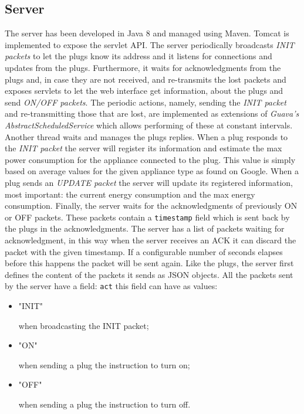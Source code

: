 \documentclass[conference]{IEEEtran}
\begin{document}
	\subsection{Server}\label{SVR}
	The server has been developed in Java 8 and managed using Maven. Tomcat is implemented to expose the servlet API. The server periodically broadcasts \textit{INIT packets} to let the plugs know its address and it listens for connections and updates from the plugs. Furthermore, it waits for acknowledgments from the plugs and, in case they are not received, and re-transmits the lost packets and exposes servlets to let the web interface get information, about the plugs and send \textit{ON/OFF packets}. The periodic actions, namely, sending the \textit{INIT packet} and re-transmitting those that are lost, are implemented as extensions of \textit{Guava's AbstractScheduledService} which allows performing of these at constant intervals. Another thread waits and manages the plugs replies. When a plug responds to the \textit{INIT packet} the server will register its information and estimate the max power consumption for the appliance connected to the plug. This value is simply based on average values for the given appliance type as found on Google. When a plug sends an \textit{UPDATE packet} the server will update its registered information, most important: the current energy consumption and the max energy consumption. Finally, the server waits for the acknowledgments of previously ON or OFF packets. These packets contain a \verb|timestamp| field which is sent back by the plugs in the acknowledgments. The server has a list of packets waiting for acknowledgment, in this way when the server receives an ACK it can discard the packet with the given timestamp. If a configurable number of seconds elapses before this happens the packet will be sent again. Like the plugs, the server first defines the content of the packets it sends as JSON objects. All the packets sent by the server have a field: \verb|act| this field can have as values:
	\begin{itemize}
		\item \begin{spverbatim}"INIT"\end{spverbatim} when broadcasting the INIT packet;
		\item \begin{spverbatim}"ON"\end{spverbatim} when sending a plug the instruction to turn on;
		\item \begin{spverbatim}"OFF"\end{spverbatim} when sending a plug the instruction to turn off.
	\end{itemize}
\end{document}

